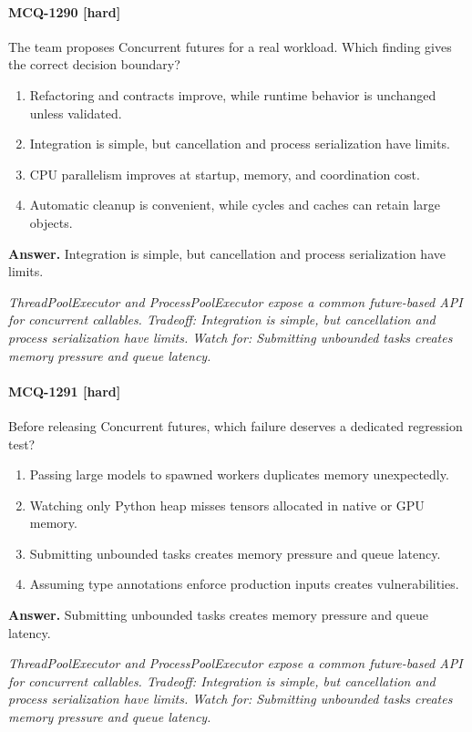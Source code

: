\paragraph{MCQ-1290 [hard]} The team proposes Concurrent futures for a real workload. Which finding gives the correct decision boundary?
\begin{enumerate}[label=\Alph*.]
\item Refactoring and contracts improve, while runtime behavior is unchanged unless validated.
\item Integration is simple, but cancellation and process serialization have limits.
\item CPU parallelism improves at startup, memory, and coordination cost.
\item Automatic cleanup is convenient, while cycles and caches can retain large objects.
\end{enumerate}
\noindent\textbf{Answer.} Integration is simple, but cancellation and process serialization have limits.
\par\textit{ThreadPoolExecutor and ProcessPoolExecutor expose a common future-based API for concurrent callables. Tradeoff: Integration is simple, but cancellation and process serialization have limits. Watch for: Submitting unbounded tasks creates memory pressure and queue latency.}
\paragraph{MCQ-1291 [hard]} Before releasing Concurrent futures, which failure deserves a dedicated regression test?
\begin{enumerate}[label=\Alph*.]
\item Passing large models to spawned workers duplicates memory unexpectedly.
\item Watching only Python heap misses tensors allocated in native or GPU memory.
\item Submitting unbounded tasks creates memory pressure and queue latency.
\item Assuming type annotations enforce production inputs creates vulnerabilities.
\end{enumerate}
\noindent\textbf{Answer.} Submitting unbounded tasks creates memory pressure and queue latency.
\par\textit{ThreadPoolExecutor and ProcessPoolExecutor expose a common future-based API for concurrent callables. Tradeoff: Integration is simple, but cancellation and process serialization have limits. Watch for: Submitting unbounded tasks creates memory pressure and queue latency.}
